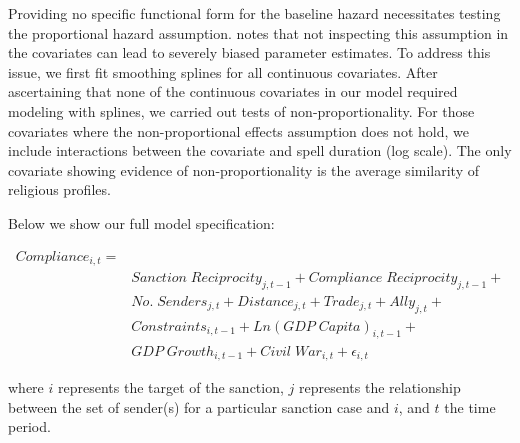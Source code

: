 Providing no specific functional form for the baseline hazard necessitates testing the proportional hazard assumption. \citet{keele2010proportionally} notes that not inspecting this assumption in the covariates can lead to severely biased parameter estimates. To address this issue, we first fit smoothing splines for all continuous covariates. After ascertaining that none of the continuous covariates in our model required modeling with splines, we carried out tests of non-proportionality. For those covariates where the non-proportional effects assumption does not hold, we include interactions between the covariate and spell duration (log scale). The only covariate showing evidence of non-proportionality is the average similarity of religious profiles.

Below we show our full model specification: 

\begin{align*}
		Compliance_{i,t} =& \\
		&Sanction \; Reciprocity_{j,t-1} + Compliance \; Reciprocity_{j,t-1} + \\
		&No. \; Senders_{j,t} + Distance_{j,t} + Trade_{j,t} + Ally_{j,t} + \\
		&Constraints_{i,t-1} + Ln(GDP \; Capita)_{i,t-1} +\\
		&GDP \; Growth_{i,t-1} + Civil \; War_{i,t} + \epsilon_{i,t}
\end{align*}

where $i$ represents the target of the sanction, $j$ represents the relationship between the set of sender(s) for a particular sanction case and $i$, and $t$ the time period.